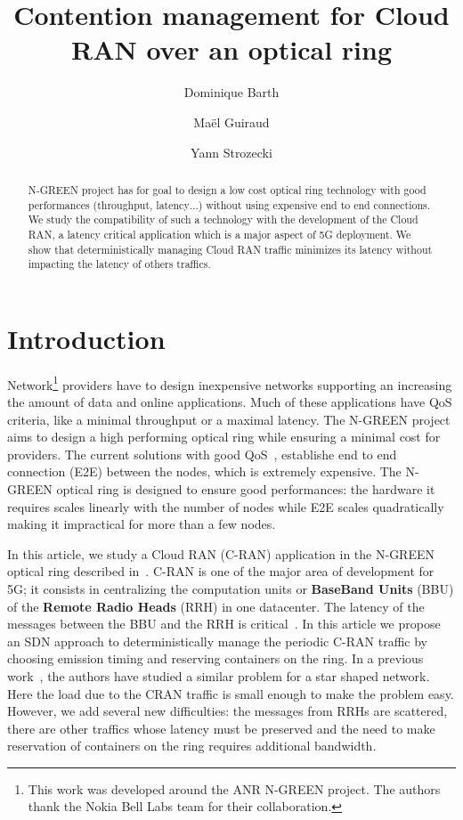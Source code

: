 \documentclass[]{algotel}
\title{Contention management for Cloud RAN over an optical ring}
\author{Dominique Barth\addressmark{1}
  \and Ma\"el Guiraud\addressmark{1}
   \and Yann Strozecki\addressmark{1}
  }
\begin{document}
\maketitle


\begin{abstract}
N-GREEN project has for goal to design a low cost optical ring technology with good performances (throughput, latency$\dots$) without using expensive end to end connections. We study the compatibility of such a technology with the development of the Cloud RAN, a latency critical application which is a major aspect of 5G deployment. We show that deterministically managing Cloud RAN traffic minimizes its latency without impacting the latency of others traffics. 
\end{abstract}


\section{Introduction}

Network\footnote{This work was developed around the ANR N-GREEN project. The authors thank the Nokia Bell Labs team for their collaboration.} providers have to design inexpensive networks supporting an increasing the amount of data and online applications. Much of these applications have QoS criteria, like a minimal throughput or a maximal latency. The N-GREEN project aims to design a high performing optical ring while ensuring a minimal cost for providers. The current solutions with good QoS~\cite{pizzinat2015things}, establishe end to end connection (E2E) between the nodes, which is extremely expensive. The N-GREEN optical ring is designed to ensure good performances: the hardware it requires scales linearly with the number of nodes while E2E scales quadratically making it impractical for more than a few nodes.

In this article, we study a Cloud RAN (C-RAN) application in the N-GREEN optical ring described in~\cite{ngreenarchitecture}. C-RAN is one of the major area of development for 5G; it consists in centralizing the computation units or {\bf BaseBand Units} (BBU) of the {\bf Remote Radio Heads} (RRH) in one datacenter. The latency of the messages between the BBU and the RRH is critical~\cite{3gpp5g}. In this article we propose an SDN approach to deterministically manage the periodic C-RAN traffic by choosing emission timing and reserving containers on the ring. In a previous work~\cite{dominique2018deterministic}, the authors have studied a similar problem for a star shaped network. Here the load due to the CRAN traffic is small enough to make the problem easy. However, we add several new difficulties: the messages from RRHs are scattered, there are other traffics whose latency must be preserved and the need to make reservation of containers on the ring requires additional bandwidth.
\end{document}
